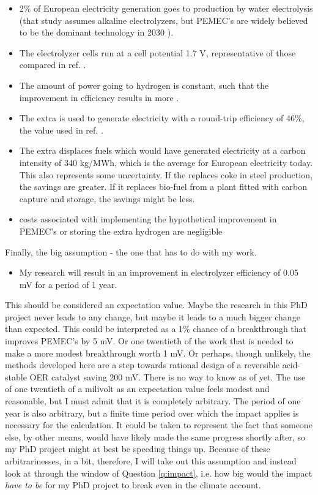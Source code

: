 \begin{itemize}
	\item 2\% of European electricity generation goes to  production by water electrolysis\cite{Sgobbi2016} (that study assumes alkaline electrolyzers, but PEMEC's are widely believed to be the dominant technology in 2030 \cite{Schmidt2017}).
	
	\item The electrolyzer cells run at a cell potential 1.7 V, representative of those compared in ref. .
	
	\item The amount of power going to hydrogen is constant, such that the improvement in efficiency results in more .
	
	\item The extra  is used to generate electricity with a round-trip efficiency of 46\%, the value used in ref. .
	
	\item The extra  displaces fuels which would have generated electricity at a carbon intensity of 340 kg/MWh, which is the average for European electricity today\cite{Moro2018}. This also represents some uncertainty. If the  replaces coke in steel production, the savings are greater. If it replaces bio-fuel from a plant fitted with carbon capture and storage, the savings might be less.
	
	\item {} costs associated with implementing the hypothetical improvement in PEMEC's or storing the extra hydrogen are negligible
\end{itemize}
Finally, the big assumption - the one that has to do with my work. 
\begin{itemize}
	\item My research will result in an improvement in electrolyzer efficiency of 0.05 mV for a period of 1 year. 
\end{itemize}
This should be considered an expectation value. Maybe the research in this PhD project never leads to any change, but maybe it leads to a much bigger change than expected. This could be interpreted as a 1\% chance of a breakthrough that improves PEMEC's by 5 mV. Or one twentieth of the work that is needed to make a more modest breakthrough worth 1 mV. Or perhaps, though unlikely, the methods developed here are a step towards rational design of a reversible acid-stable OER catalyst saving 200 mV. There is no way to know as of yet. The use of one twentieth of a milivolt as an expectation value feels modest and reasonable, but I must admit that it is completely arbitrary. The period of one year is also arbitrary, but a finite time period over which the impact applies is necessary for the calculation. It could be taken to represent the fact that someone else, by other means, would have likely made the same progress shortly after, so my PhD project might at best be speeding things up. Because of these arbitrarinesses, in a bit, therefore, I will take out this assumption and instead look at through the window of Question \ref{q:impact}, i.e. how big would the impact \textit{have to be} for my PhD project to break even in the climate account.

